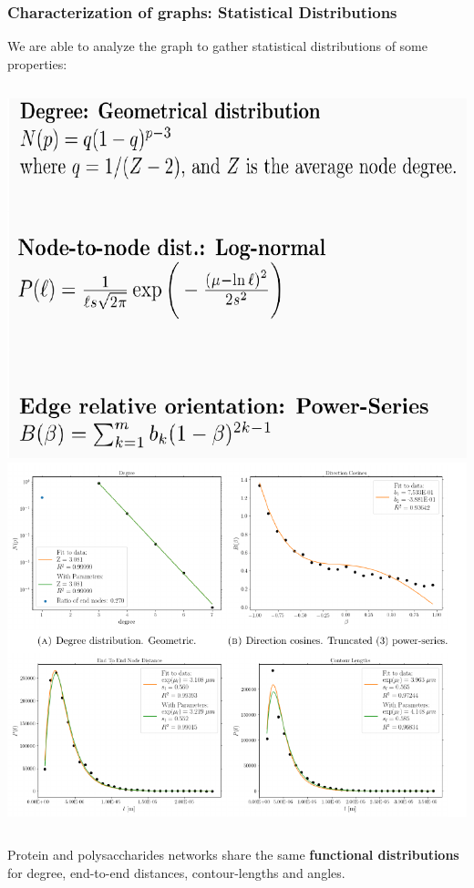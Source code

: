 \documentclass[9pt]{beamer}
\begin{document}
\begin{frame}
  \frametitle{Characterization of graphs: Statistical Distributions}
  We are able to analyze the graph to gather statistical distributions of some properties:
  \vspace{0.3cm}
  \begin{columns}[onlytextwidth]
        \includegraphics[width=0.9\linewidth]{./Figures/distributions_maths.png}
        \includegraphics[width=0.9\linewidth]{./Figures/distributions_actin.png}
  \end{columns}
  \vspace{0.3cm}
  Protein and polysaccharides networks share the same \textbf{functional distributions} for
  degree, end-to-end distances, contour-lengths and angles.
\end{frame}
\end{document}
